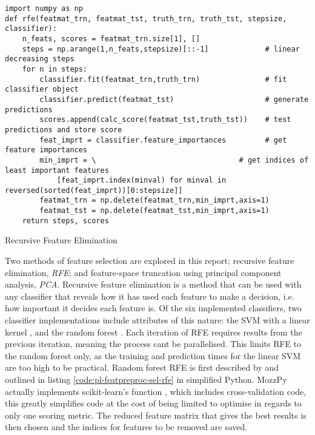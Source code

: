         \begin{listing}[ht]
            \begin{verbatim}
import numpy as np
def rfe(featmat_trn, featmat_tst, truth_trn, truth_tst, stepsize, classifier):
    n_feats, scores = featmat_trn.size[1], []
    steps = np.arange(1,n_feats,stepsize)[::-1]             # linear decreasing steps
    for n in steps:          
        classifier.fit(featmat_trn,truth_trn)               # fit classifier object
        classifier.predict(featmat_tst)                     # generate predictions
        scores.append(calc_score(featmat_tst,truth_tst))    # test predictions and store score
        feat_imprt = classifier.feature_importances         # get feature importances
        min_imprt = \                                 # get indices of least important features
            [feat_imprt.index(minval) for minval in reversed(sorted(feat_imprt))[0:stepsize]] 
        featmat_trn = np.delete(featmat_trn,min_imprt,axis=1) 
        featmat_tst = np.delete(featmat_tst,min_imprt,axis=1)
    return steps, scores
            \end{verbatim}
            \caption{Recursive Feature Elimination}
            \label{code:pl-featpreproc-sel-rfe}
        \end{listing}
        
        Two methods of feature selection are explored in this report; recursive feature elimination, \textit{RFE}; and feature-space truncation using principal component analysis, \textit{PCA}. Recursive feature elimination is a method that can be used with any classifier that reveals how it has used each feature to make a decision, i.e. how important it decides each feature is. Of the six implemented classifiers, two classifier implementations include attributes of this nature: the SVM with a linear kernel \cite{Guyon2002}, and the random forest \cite{Granitto2006}. Each iteration of RFE requires results from the previous iteration, meaning the process cant be parallelised. This limits RFE to the random forest only, as the training and prediction times for the linear SVM are too high to be practical. Random forest RFE is first described by \textcite{Granitto2006} and outlined in listing \ref{code:pl-featpreproc-sel-rfe} in simplified Python. MozzPy actually implements scikit-learn's function  \cite{Pedregosa2012}, which includes cross-validation code, this greatly simplifies code at the cost of being limited to optimise in regards to only one scoring metric. The reduced feature matrix that gives the best results is then chosen and the indices for features to be removed are saved.
        
